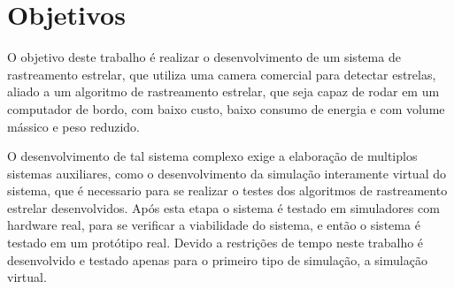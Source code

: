 \section{Objetivos}
\label{sec:Introducao_objectives}

O objetivo deste trabalho é realizar o desenvolvimento de um sistema de rastreamento estrelar, que utiliza uma camera comercial para detectar estrelas, 
aliado a um algoritmo de rastreamento estrelar, que seja capaz de rodar em um computador de bordo, com baixo custo, baixo consumo de energia e com volume mássico e peso reduzido.

O desenvolvimento de tal sistema complexo exige a elaboração de multiplos sistemas auxiliares, como o desenvolvimento da simulação interamente virtual do sistema, 
que é necessario para se realizar o testes dos algoritmos de rastreamento estrelar desenvolvidos. 
Após esta etapa o sistema é testado em simuladores com hardware real, para se verificar a viabilidade do sistema, e então o sistema é testado em um protótipo real.
Devido a restrições de tempo neste trabalho é desenvolvido e testado apenas para o primeiro tipo de simulação, a simulação virtual.
